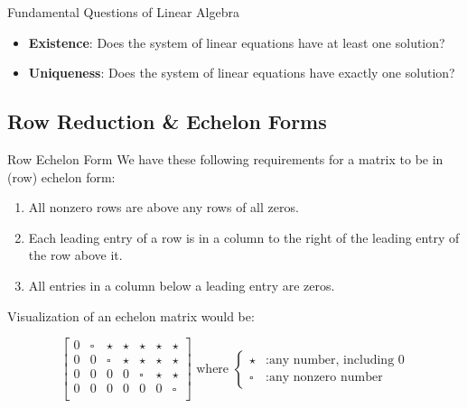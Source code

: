 \documentclass{article}
\begin{document}
\begin{boxcontainer}{Fundamental Questions of Linear Algebra}
	\begin{itemize}
		\item \textbf{Existence}: Does the system of linear equations have at least one solution?
		\item \textbf{Uniqueness}: Does the system of linear equations have exactly one solution?
	\end{itemize}
\end{boxcontainer}

\subsection{Row Reduction \& Echelon Forms}

\begin{definition}{Row Echelon Form}
	We have these following requirements for a matrix to be in (row) echelon form:
	\begin{enumerate}
		\item All nonzero rows are above any rows of all zeros.
		\item Each leading entry of a row is in a column to the right of the leading entry of the row above it.
		\item All entries in a column below a leading entry are zeros.
	\end{enumerate}

	Visualization of an echelon matrix would be:

	\begin{equation}
		\begin{bmatrix}
			0 & \square & \star   & \star & \star   & \star & \star   \\
			0 & 0       & \square & \star & \star   & \star & \star   \\
			0 & 0       & 0       & 0     & \square & \star & \star   \\
			0 & 0       & 0       & 0     & 0       & 0     & \square \\
		\end{bmatrix}
		\text{ where }
		\begin{cases}
			\star   & : \text{any number, including 0} \\
			\square & : \text{any nonzero number}
		\end{cases}
	\end{equation}
\end{definition}
\end{document}
